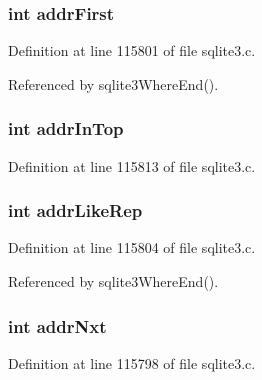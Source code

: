 \subsubsection[{addr\+First}]{\setlength{\rightskip}{0pt plus 5cm}int addr\+First}\label{struct_where_level_ab50af87e2ba502a5a49807b2eaee976e}


Definition at line 115801 of file sqlite3.\+c.



Referenced by sqlite3\+Where\+End().

\hypertarget{struct_where_level_a886641bc6cd2d7c225935df257fd81d1}{}
\subsubsection[{addr\+In\+Top}]{\setlength{\rightskip}{0pt plus 5cm}int addr\+In\+Top}\label{struct_where_level_a886641bc6cd2d7c225935df257fd81d1}


Definition at line 115813 of file sqlite3.\+c.

\hypertarget{struct_where_level_a04ef159ee611aabe3cbcfe9d5c05f306}{}
\subsubsection[{addr\+Like\+Rep}]{\setlength{\rightskip}{0pt plus 5cm}int addr\+Like\+Rep}\label{struct_where_level_a04ef159ee611aabe3cbcfe9d5c05f306}


Definition at line 115804 of file sqlite3.\+c.



Referenced by sqlite3\+Where\+End().

\hypertarget{struct_where_level_aa890851807d02a557a64464694c2190b}{}
\subsubsection[{addr\+Nxt}]{\setlength{\rightskip}{0pt plus 5cm}int addr\+Nxt}\label{struct_where_level_aa890851807d02a557a64464694c2190b}


Definition at line 115798 of file sqlite3.\+c.



